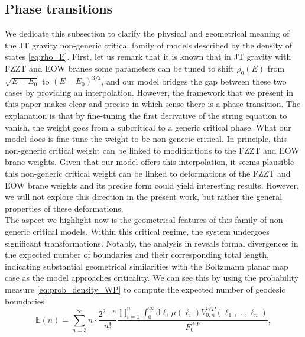 \documentclass[a4paper,11pt]{article}
\newcommand{\rmd}{\mathrm{d}}
\begin{document}
\subsection{Phase transitions}
We dedicate this subsection to clarify the physical and geometrical meaning of the JT gravity non-generic critical family of models described by the density of states \eqref{eq:rho_E}. First, let us remark that it is known that in JT gravity with FZZT \cite{Okuyama:2021Page} and EOW \cite{Gao:2021uro} branes some parameters can be tuned to shift $\rho_0(E)$ from $\sqrt{E-E_0}$ to $(E-E_0)^{3/2}$, and our model bridges the gap between these two cases by providing an interpolation. However, the framework that we present in this paper makes clear and precise in which sense there is a phase transition. The explanation is that by fine-tuning the first derivative of the string equation to vanish, the weight goes from a subcritical to a generic critical phase. What our model does is fine-tune the weight to be non-generic critical. In principle, this non-generic critical weight can be linked to modifications to the FZZT and EOW brane weights. Given that our model offers this interpolation, it seems plausible this non-generic critical weight can be linked to deformations of the FZZT and EOW brane weights and its precise form could yield interesting results. However, we will not explore this direction in the present work, but rather the general properties of these deformations.\\
The aspect we highlight now is the geometrical features of this family of non-generic critical models. Within this critical regime, the system undergoes significant transformations. Notably, the analysis in \cite{budd2023} reveals formal divergences in the expected number of boundaries and their corresponding total length, indicating substantial geometrical similarities with the Boltzmann planar map case as the model approaches criticality.
We can see this by using the probability measure \eqref{eq:prob_density_WP} to compute the expected number of geodesic boundaries  
        \begin{equation}
           \mathbb{E}(n) = \sum_{n=3}^{\infty} n\cdot\frac{2^{2-n}}{n!} \frac{\prod_{i=1}^{n} \int_{0}^{\infty}\rmd \ell_i \mu(\ell_i) V^{WP}_{0,n}(\ell_1 , ... , \ell_n)}{F^{WP}_0},
        \end{equation}
\end{document}
